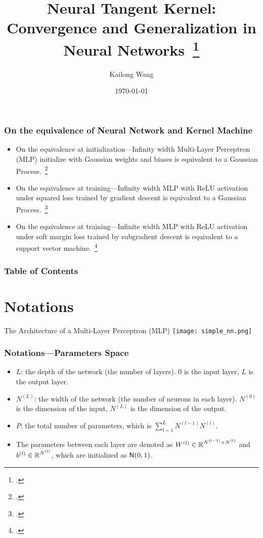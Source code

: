 \documentclass[10pt]{../Formats/RU}
\title[Neural Tangent Kernel]{Neural Tangent Kernel: Convergence and Generalization in Neural Networks~\footcite{Jacot2020}
}
\author[Kai] %
{Kailong Wang\inst{$\dagger$}
}
\institute[Rutgers] %
{
    \inst{$\dagger$}%
    Rutgers University
}
\date[\today] %
{
    \today
}
\begin{document}
\frame{\titlepage}

\begin{frame}
    \frametitle{On the equivalence of Neural Network and Kernel Machine}
    \begin{itemize}
        \item On the equivalence at initialization---Infinity width Multi-Layer Perceptron (MLP) initialize with Gaussian weights and biases is equivalent to a Gaussian Process.~\footcite{Lee2018}
        \item On the equivalence at training---Infinity width MLP with ReLU activation under squared loss trained by gradient descent is equivalent to a Gaussian Process.~\footcite{Jacot2020}
        \item On the equivalence at training---Infinite width MLP with ReLU activation under soft margin loss trained by subgradient descent is equivalent to a support vector machine.~\footcite{Chen2021}
    \end{itemize}
\end{frame}

\begin{frame}
\frametitle{Table of Contents}
\tableofcontents
\end{frame}


\section{Notations}
\begin{frame}
    {The Architecture of a Multi-Layer Perceptron (MLP)}
    \texttt{[image: simple\_nn.png]}
\end{frame}

\begin{frame}
    \frametitle{Notations---Parameters Space}
    \begin{itemize}
        \item $L$: the depth of the network (\aka the number of layers). \Eg $0$ is the input layer, $L$ is the output layer.
        \item $N^{(L)}$: the width of the network (\aka the number of neurons in each layer). \Eg $N^{(0)}$ is the dimension of the input, $N^{(L)}$ is the dimension of the output.
        \item $P$: the total number of parameters, which is $\sum_{l=1}^L N^{(l-1)}N^{(l)}$.
        \item The parameters between each layer are denoted as $W^{(l)}\in\operatorname{\mathbb{R}}^{N^{(l-1)}\times N^{(l)}}$ and $b^{(l)}\in\operatorname{\mathbb{R}}^{N^{(l)}}$, which are initialized as \iid $\operatorname{\mathsf{N}}(0,1)$.
    \end{itemize}
\end{frame}
\end{document}
